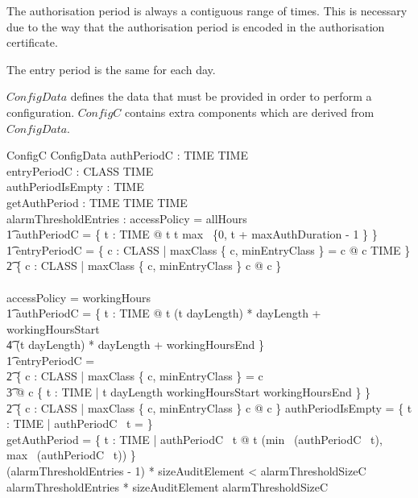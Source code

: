 The authorisation period is always a contiguous range of times. This
is necessary due to the way that the authorisation period is encoded
in the authorisation certificate.

The entry period is the same for each day. 

$ConfigData$ defines the data that must be provided in order to
perform a configuration. $ConfigC$ contains
extra components which are derived from $ConfigData$.

\begin{schema}{ConfigC}
        ConfigData
\also
        authPeriodC : TIME \fun \power TIME
\\      entryPeriodC : CLASS \fun \power TIME
\\      authPeriodIsEmpty : \power TIME
\\      getAuthPeriod : TIME \pfun TIME \cross TIME
\\      alarmThresholdEntries : \nat
\where
        accessPolicy = allHours 
\\ \t1  \land 
        authPeriodC = \{ t : TIME @ t \mapsto t \upto max~ \{0, t +
        maxAuthDuration - 1 \} \}
\\ \t1  \land 
        entryPeriodC = 
        \{ c : CLASS | maxClass \{ c, minEntryClass \} = c @ c
        \mapsto TIME \}
\\ \t2        \cup \{ c : CLASS | maxClass \{ c, minEntryClass \} \neq
        c @ c \mapsto \emptyset \}
\\      \lor 
\\      accessPolicy = workingHours 
\\ \t1  \land authPeriodC = \{ t :
        TIME @ t \mapsto (t \div dayLength) * dayLength +
        workingHoursStart \upto  
\\ \t4  (t \div dayLength) * dayLength + workingHoursEnd \}
\\ \t1  \land entryPeriodC = 
\\ \t2        \{ c : CLASS | maxClass \{ c, minEntryClass \} = c 
\\ \t3  @ c \mapsto
        \{ t : TIME | t \mod dayLength \in
        workingHoursStart \upto workingHoursEnd \} \}          
\\ \t2  \cup \{ c : CLASS | maxClass \{ c, minEntryClass \} \neq c @ c
        \mapsto \emptyset \}
\also
        authPeriodIsEmpty = \{ t : TIME | authPeriodC~ t = \emptyset
        \}
\\      getAuthPeriod = \{ t : TIME | authPeriodC~ t \neq \emptyset @
        t \mapsto (min~ (authPeriodC~ t), max~ (authPeriodC~ t)) \}   
\also
\\      (alarmThresholdEntries - 1) * sizeAuditElement < alarmThresholdSizeC
\\      alarmThresholdEntries * sizeAuditElement \geq alarmThresholdSizeC 
\end{schema}

